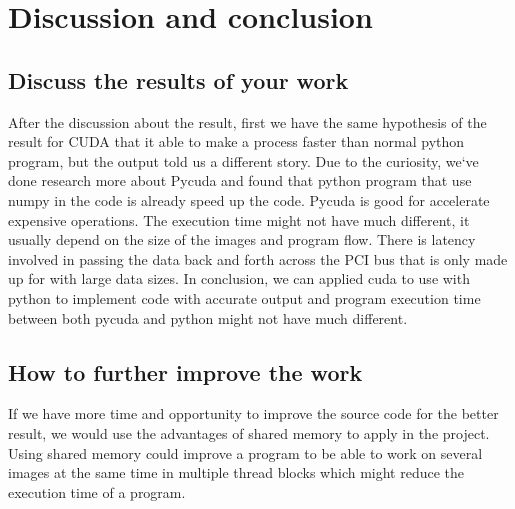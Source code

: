\documentclass[11pt]{article}
\begin{document}
\newpage
\section{Discussion and conclusion}\label{sec:dis}
\subsection{Discuss the results of your work}
After the discussion about the result, first we have the same hypothesis of the result for CUDA that it able to make a process faster than normal python program, but the output told us a different story. Due to the curiosity, we‘ve done research more about Pycuda and found that python program that use numpy in the code is already speed up the code. Pycuda is good for accelerate expensive operations. The execution time might not have much different, it usually depend on the size of the images and program flow. There is latency involved in passing the data back and forth across the PCI bus that is only made up for with large data sizes. In conclusion, we can applied cuda to use with python to implement code with accurate output and program execution time between both pycuda and python might not have much different\cite{python}.
\subsection{How to further improve the work}
If we have more time and opportunity to improve the source code for the better result, we would use the advantages of shared memory to apply in the project. Using shared memory could improve a program to be able to work on several images at the same time in multiple thread blocks which might reduce the execution time of a program.
\end{document}
